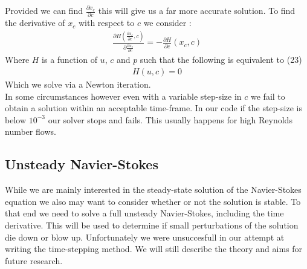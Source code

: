 \documentclass[11pt,twoside,a4paper]{article}
\begin{document}
Provided we can find $\frac{\partial x_c}{\partial c}$ this will give us a far more accurate solution.
To find the derivative of $x_c$ with respect to $c$ we consider :\\
\begin{align}
\frac{\partial H (\frac{\partial x_c}{\partial c},c)}{\partial \frac{\partial x_c}{\partial c}}  = - \frac{\partial H}{\partial c}(x_c,c)
\end{align}
Where $H$ is a function of $u$, $c$ and $p$ such that the following is equivalent to (23)
\begin{align*}
H(u,c) = 0
\end{align*}
Which we solve via a Newton iteration.\\
In some circumstances however even with a variable step-size in $c$ we fail to obtain a solution within an acceptable time-frame. In our code if the step-size is below $10^{-3}$ our solver stops and fails. This usually happens for high Reynolds number flows.

\subsection{Unsteady Navier-Stokes}

While we are mainly interested in the steady-state solution of the Navier-Stokes equation we also may want to consider whether or not the solution is stable. To that end we need to solve a full unsteady Navier-Stokes, including the time derivative. This will be used to determine if small perturbations of the solution die down or blow up. Unfortunately we were unsuccesfull in our attempt at writing the time-stepping method. We will still describe the theory and aims for future research.
\end{document}
